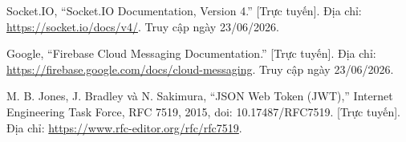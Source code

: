 \documentclass[../DoAn.tex]{subfiles}
\begin{document}
\begin{enumerate}[label={[{\arabic*}]},leftmargin=1.2cm,labelsep=0.3cm]
    \item Socket.IO, ``Socket.IO Documentation, Version 4.'' [Trực tuyến].
    Địa chỉ: \url{https://socket.io/docs/v4/}. Truy cập ngày 23/06/2026.

    \item Google, ``Firebase Cloud Messaging Documentation.''
    [Trực tuyến]. Địa chỉ:
    \url{https://firebase.google.com/docs/cloud-messaging}. Truy cập ngày
    23/06/2026.

    \item M. B. Jones, J. Bradley và N. Sakimura, ``JSON Web Token
    (JWT),'' Internet Engineering Task Force, RFC 7519, 2015,
    doi: 10.17487/RFC7519. [Trực tuyến]. Địa chỉ:
    \url{https://www.rfc-editor.org/rfc/rfc7519}.


\end{enumerate}
\end{document}
